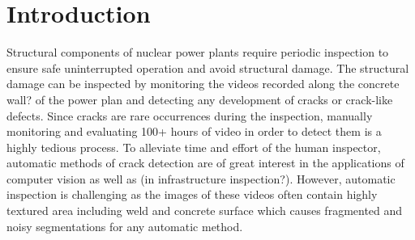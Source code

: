 
\section{Introduction}

    
    Structural components of nuclear power plants require periodic inspection to ensure safe uninterrupted operation and avoid structural damage. The structural damage can be inspected by monitoring the videos recorded along the concrete wall? of the power plan and detecting any development of cracks or crack-like defects. Since cracks are rare occurrences during the inspection, manually monitoring and evaluating 100+ hours of video in order to detect them is a highly tedious process. To alleviate time and effort of the human inspector, automatic methods of crack detection are of great interest in the applications of computer vision as well as (in infrastructure inspection?).   However, automatic inspection is challenging as the images of these videos often contain highly textured area including weld and concrete surface which causes fragmented and noisy segmentations for any automatic method.
    

